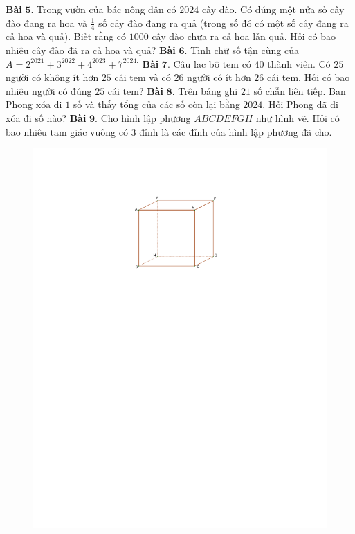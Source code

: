 \begin{multicols}{2}
\begin{table}[H]
\begin{tabular}{ccc}
		\end{tabular}	
		\vspace*{-10pt}
	\end{table}
	\textbf{\color{toancuabi}Bài} $\pmb{5.}$ Trong vườn của bác nông dân có $2024$ cây đào. Có đúng một nửa số cây đào đang ra hoa và $\frac{1}{4}$ số cây đào đang ra quả (trong số đó có một số cây đang ra cả hoa và quả). Biết rằng có $1000$ cây đào chưa ra cả hoa lẫn quả. Hỏi có bao nhiêu cây đào đã ra cả hoa và quả?
	\vskip 0.1cm
	\textbf{\color{toancuabi}Bài} $\pmb{6.}$ Tình chữ số tận cùng của $A = 2^{2021} + 3^{2022} + 4^{2023} + 7^{2024.}$
	\vskip 0.1cm
	\textbf{\color{toancuabi}Bài} $\pmb{7.}$ Câu lạc bộ tem có $40$ thành viên. Có $25$ người có không ít hơn $25$ cái tem và có $26$ người có ít hơn $26$ cái tem. Hỏi có bao nhiêu người có đúng $25$ cái tem?
	\vskip 0.1cm
	\textbf{\color{toancuabi}Bài} $\pmb{8.}$ Trên bảng ghi $21$ số chẵn liên tiếp. Bạn Phong xóa đi $1$ số và thấy tổng của các số còn lại bằng $2024$. Hỏi Phong đã đi xóa đi số nào?
	\vskip 0.1cm
	\textbf{\color{toancuabi}Bài} $\pmb{9.}$ Cho hình lập phương $ABCDEFGH$ như hình vẽ. Hỏi có bao nhiêu tam giác vuông có $3$ đỉnh là các đỉnh của hình lập phương đã cho.
	\begin{figure}[H]
		\vspace*{-5pt}
		\centering
		\captionsetup{labelformat= empty, justification=centering}
		\includegraphics[width= 0.7\linewidth]{bai9}

\end{figure}
\end{multicols}
